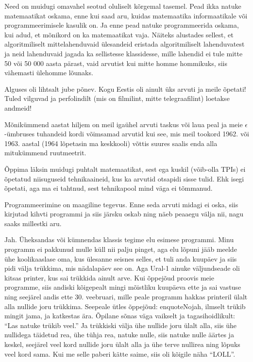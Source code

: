 Need on muidugi omavahel seotud oluliselt kõrgemal tasemel. Pead ikka natuke matemaatikat oskama, enne kui saad aru, kuidas matemaatika informaatikale või programmeerimisele kasulik on. Ja 
enne pead natuke programmeerida oskama, kui adud, et mõnikord on ka
matemaatikat vaja. Näiteks alustades sellest, et algoritmiliselt 
mittelahenduvaid ülesandeid eristada algoritmiliselt lahenduvatest ja neid 
lahenduvaid jagada ka sellistesse klassidesse, mille lahendid ei tule mitte 50 
või 50 000 aasta pärast, vaid arvutist kui mitte homme 
hommikuks, siis vähemasti ülehomme lõunaks.


Alguses oli lihtsalt jube põnev. Kogu Eestis oli ainult üks arvuti ja meile 
õpetati! Tuled vilguvad ja perfolindilt (mis on filmilint, mitte 
telegraafilint) loetakse andmeid! 

Mõnikümmend aastat hiljem on meil igaühel arvuti taskus või laua peal ja meie $\epsilon$-ümbruses tuhandeid kordi võimsamad arvutid kui see, mis meil tookord 1962. või 1963. aastal (1964 lõpetasin ma keskkooli) võttis suures 
saalis enda alla mitukümmend ruutmeetrit. 

Õppima läksin muidugi puhtalt matemaatikat, sest ega kuskil (võib-olla TPIs) ei õpetatud niisuguseid 
tehnikaaineid, kus ka arvutid otsapidi sisse tulid. Ehk isegi õpetati, aga ma 
ei tahtnud, sest tehnikapool mind väga ei tõmmanud. 

Programmeerimine on maagiline tegevus. Enne 
seda arvuti midagi ei oska, siis kirjutad kihvti programmi ja 
siis järsku oskab ning näeb peaaegu välja nii, nagu saaks 
millestki aru. 


Jah. Üheksandas või kümnendas klassis tegime elu esimese 
programmi. Minu programm ei pakkunud mulle küll nii palju pinget, aga elu lõpuni 
jääb meelde ühe koolikaaslase oma, kus ülesanne seisnes selles, 
et tuli anda kuupäev ja siis pidi välja trükkima, mis nädalapäev see on. Aga 
Ural-1 ainuke väljundseade oli 
kitsas printer, kus sai trükkida ainult arve. Kui õppejõud proovis 
meie programme, siis andiski kõigepealt mingi mõistliku kuupäeva ette ja sai 
vastuse ning seejärel andis ette 30. veebruari, mille peale programm hakkas 
printeril ülalt alla nullide joru trükkima. Seepeale ütles õppejõud: 
enquote{Nojah, ilmselt trükib mingit jama,} ja katkestas ära. 
Õpilane sõnas väga vaikselt ja tagasihoidlikult: \enquote{Las natuke trükib veel.} Ja trükkiski välja ühe nullide joru ülalt alla, siis ühe 
nullidega täidetud rea, ühe tühja rea, natuke nulle, siis natuke 
nulle äärtes ja keskel, seejärel veel kord nullide joru 
ülalt alla ja ühe terve nullirea ning lõpuks veel kord sama. Kui me selle 
paberi kätte saime, siis oli kõigile näha \enquote{LOLL}. 

